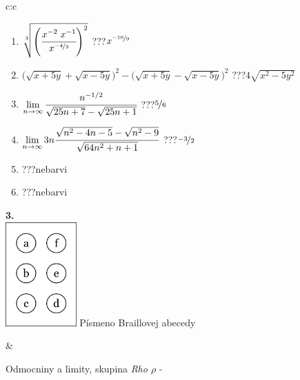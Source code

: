 \documentclass[10pt]{report}
\begin{document}
\begin{tabular}{c:c}
\begin{minipage}[c][104.5mm][t]{0.5\linewidth}
\begin{center}
\begin{minipage}{0.79\linewidth}
\begin{center}
\begin{varwidth}{\linewidth}
\begin{enumerate}
\small
\item $\sqrt[3]{\left(\cfrac{x^{-2}\;x^{-1}}{x^{\nicefrac{-4}{3}}}\right)^{2}}$\quad \dotfill\; ???\;\dotfill \quad $x^{\nicefrac{-10}{9}}$
\item {\footnotesize{\scriptsize$\big(\sqrt{x+5y}+\sqrt{x-5y}\big)^2-\big(\sqrt{x+5y}-\sqrt{x-5y}\big)^2$}\quad \dotfill\; ???\;\dotfill \quad $4\sqrt{x^2-5y^2}$}
\item $\lim\limits_{n\to\infty}\cfrac{n^{-1/2}}{\sqrt{25n+7}-\sqrt{25n+1}}$\quad \dotfill\; ???\;\dotfill \quad $\nicefrac{5}{6}$
\item $\lim\limits_{n\to\infty}3n\cfrac{\sqrt{n^2-4n-5}-\sqrt{n^2-9}}{\sqrt{64n^2+n+1}}$\quad \dotfill\; ???\;\dotfill \quad $\nicefrac{-3}{2}$
\item \quad \dotfill\; ???\;\dotfill \quad nebarvi
\item \quad \dotfill\; ???\;\dotfill \quad nebarvi
\end{enumerate}
\end{varwidth}
\end{center}
\end{minipage}
\begin{minipage}{0.20\linewidth}
\begin{center}
{\Huge\bfseries 3.} \\[2mm]
\includegraphics[height=40mm]{../images/braille.png}
{\small Písmeno Braillovej abecedy}
\end{center}
\end{minipage}
\end{center}
\end{minipage}
&
\begin{minipage}[c][104.5mm][t]{0.5\linewidth}
\begin{center}
\vspace{7mm}
{\huge Odmocniny a limity, skupina \textit{Rho $\rho$} -}\\[5mm]

\end{center}
\end{minipage}
\end{tabular}
\end{document}
